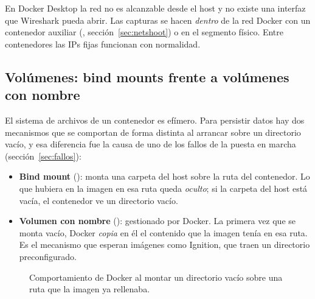 \begin{aviso}
En Docker Desktop la red  no es alcanzable desde el host y no existe una interfaz  que Wireshark pueda abrir. Las capturas se hacen \emph{dentro} de la red Docker con un contenedor auxiliar (, sección~\ref{sec:netshoot}) o en el segmento físico. Entre contenedores las IPs fijas funcionan con normalidad.
\end{aviso}

\subsection{Volúmenes: bind mounts frente a volúmenes con nombre}
\label{sec:volumenes}

El sistema de archivos de un contenedor es efímero. Para persistir datos hay dos mecanismos que se comportan de forma distinta al arrancar sobre un directorio vacío, y esa diferencia fue la causa de uno de los fallos de la puesta en marcha (sección~\ref{sec:fallos}):

\begin{itemize}
  \item \textbf{Bind mount} (): monta una carpeta del host sobre la ruta del contenedor. Lo que hubiera en la imagen en esa ruta queda \emph{oculto}; si la carpeta del host está vacía, el contenedor ve un directorio vacío.
  \item \textbf{Volumen con nombre} (): gestionado por Docker. La primera vez que se monta vacío, Docker \emph{copia} en él el contenido que la imagen tenía en esa ruta. Es el mecanismo que esperan imágenes como Ignition, que traen un directorio  preconfigurado.
\end{itemize}

\begin{figure}[H]
\centering
{}
\caption{Comportamiento de Docker al montar un directorio vacío sobre una ruta que la imagen ya rellenaba.}
\label{fig:volumenes}
\end{figure}

